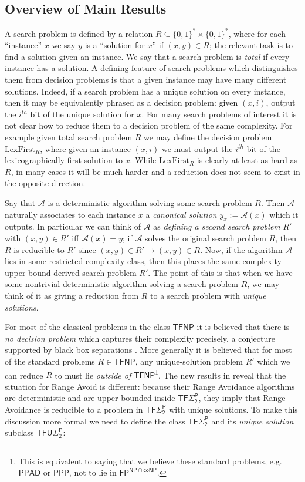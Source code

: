 \documentclass[11pt]{article}
\newcommand{\B}{\{0,1\}}
\begin{document}
\subsection{Overview of Main Results}
A search problem is defined by a relation $R \subseteq \B^* \times \B^*$, where for each ``instance'' $x$ we say $y$ is a ``solution for $x$'' if $(x,y) \in R$; the relevant task is to find a solution given an instance. We say that a search problem is \emph{total} if every instance has a solution. A defining feature of search problems which distinguishes them from decision problems is that a given instance may have many different solutions. 
Indeed, if a search problem has a unique solution on every instance, then it may be equivalently phrased as a decision problem: given $(x,i)$, output the $i^{th}$ bit of the unique solution for $x$.
For many search problems of interest it is not clear how to reduce them to a decision problem of the same complexity. For example given total search problem $R$ we may define the decision problem $\mathrm{LexFirst}_R$, where given an instance $(x,i)$ we must output the $i^{th}$ bit of the lexicographically first solution to $x$. While $\mathrm{LexFirst}_R$ is clearly at least as hard as $R$, in many cases it will be much harder and a reduction does not seem to exist in the opposite direction. 


Say that $\mathcal{A}$ is a deterministic algorithm solving some search problem $R$. Then $\mathcal{A}$ naturally associates to each instance $x$ a \emph{canonical solution} $y_x:= \mathcal{A}(x)$ which it outputs. In particular we can think of $\mathcal{A}$ as \emph{defining a second search problem} $R'$ with $(x,y) \in R'$ iff $\mathcal{A}(x)=y$; if $\mathcal{A}$ solves the original search problem $R$, then $R$ is reducible to $R'$ since $(x,y)\in R' \rightarrow (x,y)\in R$. Now, if the algorithm $\mathcal{A}$ lies in some restricted complexity class, then this places the same complexity upper bound derived search problem $R'$. The point of this is that when we have some nontrivial deterministic algorithm solving a search problem $R$, we may think of it as giving a reduction from $R$ to a search problem with \emph{unique solutions}.

For most of the classical problems in the class $\mathsf{TFNP}$ it is believed that there is \emph{no decision problem} which captures their complexity precisely, a conjecture supported by black box separations \cite{TFNP-separations}. More generally it is believed that for most of the standard problems $R \in \mathsf{TFNP}$, any unique-solution problem $R'$ which we can reduce $R$ to must lie \emph{outside of} $\mathsf{TFNP}$\footnote{This is equivalent to saying that we believe these standard problems, e.g. $\mathsf{PPAD}$ or $\mathsf{PPP}$, not to lie in $\mathsf{FP^{NP \cap coNP}}$.}. The new results in \cite{Li,CHR} reveal that the situation for Range Avoid is different: because their Range Avoidance algorithms are deterministic and are upper bounded inside $\mathsf{TF\Sigma_2^P}$, they imply that Range Avoidance is reducible to a problem in $\mathsf{TF\Sigma_2^P}$ with unique solutions. To make this discussion more formal we need to define the class $\mathsf{TF\Sigma_2^P}$ and its \emph{unique solution} subclass $\mathsf{TFU\Sigma_2^P}$:
\end{document}
